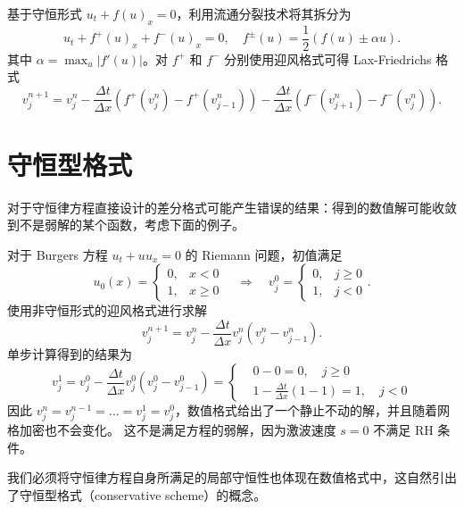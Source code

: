 \begin{example}
    基于守恒形式 $u_t + f(u)_x = 0$，利用流通分裂技术将其拆分为
    \[
        u_t + f^+(u)_x + f^-(u)_x = 0,\quad f^{\pm}(u) = \frac12(f(u)\pm \alpha u).
    \]
    其中 $\alpha = \max_u |f'(u)|$。对 $f^+$ 和 $f^-$ 分别使用迎风格式可得 Lax-Friedrichs 格式
    \[
        v_j^{n+1} = v_j^n - \frac{\Delta t}{\Delta x}(f^+(v_{j}^n)-f^+(v_{j-1}^n))
        - \frac{\Delta t}{\Delta x}(f^-(v_{j+1}^n)-f^-(v_{j}^n)).
    \]
\end{example}

\section{守恒型格式}

对于守恒律方程直接设计的差分格式可能产生错误的结果：得到的数值解可能收敛到不是弱解的某个函数，考虑下面的例子。

\begin{example}
    对于 Burgers 方程 $u_t + u u_x = 0$ 的 Riemann 问题，初值满足
    \[
        u_0(x) =
        \begin{cases}
            0, & x < 0   \\
            1, & x \ge 0
        \end{cases} \quad \Rightarrow \quad  v_j^0 =
        \begin{cases}
            0, & j \ge 0 \\
            1, & j < 0
        \end{cases}.
    \]
    使用非守恒形式的迎风格式进行求解
    \[
        v_j^{n+1} = v_j^n - \frac{\Delta t}{\Delta x} v_j^n (v_{j}^n-v_{j-1}^n).
    \]
    单步计算得到的结果为
    \[
        v_j^1 = v_j^0 - \frac{\Delta t}{\Delta x} v_j^0 (v_{j}^0 - v_{j-1}^0)
        =
        \left\{
        \begin{aligned}
             & 0 - 0 = 0,\quad j \ge 0                             \\
             & 1 - \frac{\Delta t}{\Delta x}(1-1) = 1, \quad j < 0
        \end{aligned}
        \right.
    \]
    因此 $v_j^n = v_j^{n-1} = \dots = v_j^1 = v_j^0$，数值格式给出了一个静止不动的解，并且随着网格加密也不会变化。
    这不是满足方程的弱解，因为激波速度 $s = 0$ 不满足 RH 条件。
\end{example}

我们必须将守恒律方程自身所满足的局部守恒性也体现在数值格式中，这自然引出了守恒型格式（conservative scheme）的概念。

